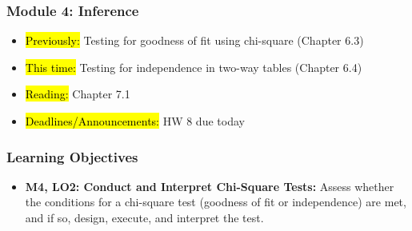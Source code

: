 
\begin{frame}
    \frametitle{Module 4: Inference}
    \begin{itemize}
        \item \hl{Previously: }Testing for goodness of fit using chi-square (Chapter 6.3)
        \item \hl{This time: }Testing for independence in two-way tables (Chapter 6.4)
        \item \hl{Reading: }Chapter 7.1
        \item \hl{Deadlines/Announcements: }HW 8 due today
    \end{itemize}

\end{frame}

\begin{frame}
    \frametitle{Learning Objectives}
    \begin{itemize}
        \item \textbf{M4, LO2: Conduct and Interpret Chi-Square Tests:} Assess whether the conditions for a chi-square test (goodness of fit or independence) are met, and if so, design, execute, and interpret the test.
    \end{itemize}
\end{frame}
